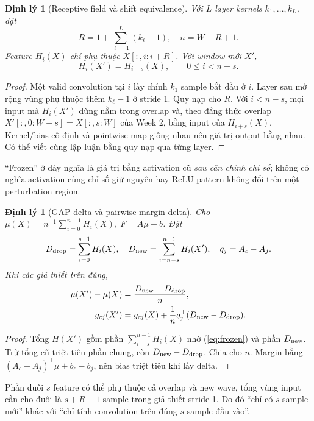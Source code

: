 \documentclass[11pt,a4paper]{article}
\newtheorem{theorem}[definition]{Định lý}
\theoremstyle{remark}
\begin{document}
\begin{theorem}[Receptive field và shift equivalence]\label{th:feature}
Với $L$ layer kernels $k_1,\ldots,k_L$, đặt
\begin{equation}
 R=1+\sum_{\ell=1}^L(k_\ell-1),\quad n=W-R+1.
\end{equation}
Feature $H_i(X)$ chỉ phụ thuộc $X[:,i:i+R]$. Với window mới $X'$,
\begin{equation}
 H_i(X')=H_{i+s}(X),\qquad 0\le i<n-s.
 \label{eq:frozen}
\end{equation}
\end{theorem}
\begin{proof}
Một valid convolution tại $i$ lấy chính $k_1$ sample bắt đầu ở $i$.
Layer sau mở rộng vùng phụ thuộc thêm $k_\ell-1$ ở stride 1. Quy nạp cho
$R$. Với $i<n-s$, mọi input mà $H_i(X')$ dùng nằm trong overlap và, theo
đẳng thức overlap $X'[:,0:W-s]=X[:,s:W]$ của Week 2, bằng input của $H_{i+s}(X)$. Kernel/bias cố định
và pointwise map giống nhau nên giá trị output bằng nhau. Có thể viết cùng
lập luận bằng quy nạp qua từng layer.
\end{proof}
``Frozen'' ở đây nghĩa là giá trị bằng activation cũ \emph{sau căn chỉnh
chỉ số}; không có nghĩa activation cùng chỉ số giữ nguyên hay ReLU pattern
không đổi trên một perturbation region.

\begin{theorem}[GAP delta và pairwise-margin delta]\label{th:gap}
Cho $\mu(X)=n^{-1}\sum_{i=0}^{n-1}H_i(X)$, $F=A\mu+b$. Đặt
\begin{equation}
 D_{\rm drop}=\sum_{i=0}^{s-1}H_i(X),\quad
 D_{\rm new}=\sum_{i=n-s}^{n-1}H_i(X'),\quad q_j=A_c-A_j.
\end{equation}
Khi các giả thiết trên đúng,
\begin{align}
 \mu(X')-\mu(X)&=\frac{D_{\rm new}-D_{\rm drop}}n,\\
 g_{cj}(X')&=g_{cj}(X)+\frac1nq_j^\top(D_{\rm new}-D_{\rm drop}).
 \label{eq:gapmargin}
\end{align}
\end{theorem}
\begin{proof}
Tổng $H(X')$ gồm phần $\sum_{i=s}^{n-1}H_i(X)$ nhờ
(\ref{eq:frozen}) và phần $D_{\rm new}$. Trừ tổng cũ triệt tiêu phần chung,
còn $D_{\rm new}-D_{\rm drop}$. Chia cho $n$. Margin bằng
$(A_c-A_j)^\top\mu+b_c-b_j$, nên bias triệt tiêu khi lấy delta.
\end{proof}
Phần đuôi $s$ feature có thể phụ thuộc cả overlap và new wave, tổng vùng
input cần cho đuôi là $s+R-1$ sample trong giả thiết stride 1. Do đó
``chỉ có $s$ sample mới'' khác với ``chỉ tính convolution trên đúng $s$
sample đầu vào''.
\end{document}
